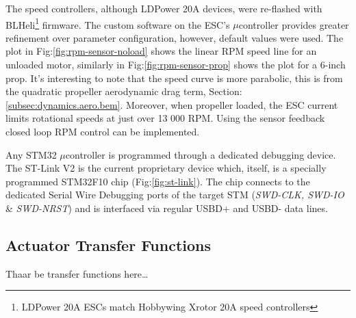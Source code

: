 \par
The speed controllers, although LDPower 20A devices, were re-flashed with BLHeli\footnote{LDPower 20A ESCs match Hobbywing Xrotor 20A speed controllers}\cite{BLHeli} firmware. The custom software on the ESC's $\mu$controller provides greater refinement over parameter configuration, however, default values were used. The plot in Fig:\ref{fig:rpm-sensor-noload} shows the linear RPM speed line for an unloaded motor, similarly in Fig:\ref{fig:rpm-sensor-prop} shows the plot for a 6-inch prop. It's interesting to note that the speed curve is more parabolic, this is from the quadratic propeller aerodynamic drag term, Section:\ref{subsec:dynamics.aero.bem}. Moreover, when propeller loaded, the ESC current limits rotational speeds at just over 13 000 RPM. Using the sensor feedback closed loop RPM control can be implemented.
\par
Any STM32 $\mu$controller is programmed through a dedicated debugging device. The ST-Link V2\cite{st-link} is the current proprietary device which, itself, is a specially programmed STM32F10 chip (Fig:\ref{fig:st-link}). The chip connects to the dedicated Serial Wire Debugging ports of the target STM (\emph{SWD-CLK, SWD-IO} \& \emph{SWD-NRST}) and is interfaced via regular USBD+ and USBD- data lines. 
\subsection{Actuator Transfer Functions}
\label{subsec:proto.design.transfer}
Thaar be transfer functions here\ldots

